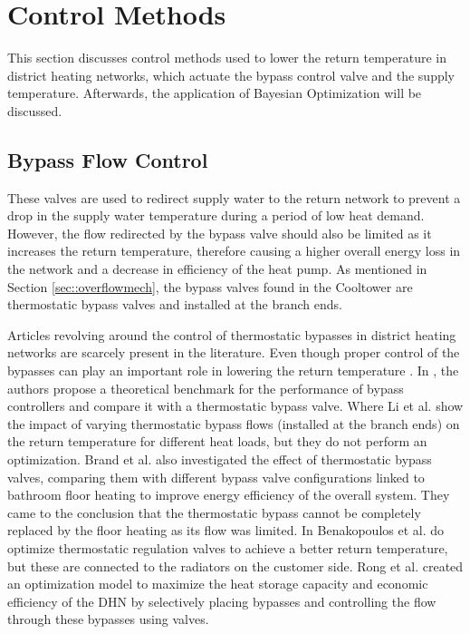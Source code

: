 \chapter{Control Methods}\label{chap::optimization}
This section discusses control methods used to lower the return temperature in district heating networks, which actuate the bypass control valve and the supply temperature. Afterwards, the application of Bayesian Optimization will be discussed. 

\section{Bypass Flow Control}
These valves are used to redirect supply water to the return network to prevent a drop in the supply water temperature during a period of low heat demand. However, the flow redirected by the bypass valve should also be limited as it increases the return temperature, therefore causing a higher overall energy loss in the network and a decrease in efficiency of the heat pump. As mentioned in Section \ref{sec::overflowmech}, the bypass valves found in the Cooltower are thermostatic bypass valves and installed at the branch ends. 

Articles revolving around the control of thermostatic bypasses in district heating networks are scarcely present in the literature. Even though proper control of the bypasses can play an important role in lowering the return temperature \cite{app15062982,VANDERMEULEN201845}. In \cite{VANDERMEULEN201845}, the authors propose a theoretical benchmark for the performance of bypass controllers and compare it with a thermostatic bypass valve. Where Li et al. \cite{DTUlibrary} show the impact of varying thermostatic bypass flows (installed at the branch ends) on the return temperature for different heat loads, but they do not perform an optimization. Brand et al. \cite{BRAND2014256} also investigated the effect of thermostatic bypass valves, comparing them with different bypass valve configurations linked to bathroom floor heating to improve energy efficiency of the overall system. They came to the conclusion that the thermostatic bypass cannot be completely replaced by the floor heating as its flow was limited. In \cite{BENAKOPOULOS2021120928} Benakopoulos et al. do optimize thermostatic regulation valves to achieve a better return temperature, but these are connected to the radiators on the customer side. Rong et al. \cite{RONG2025116197} created an optimization model to maximize the heat storage capacity and economic efficiency of the DHN by selectively placing bypasses and controlling the flow through these bypasses using valves. 

